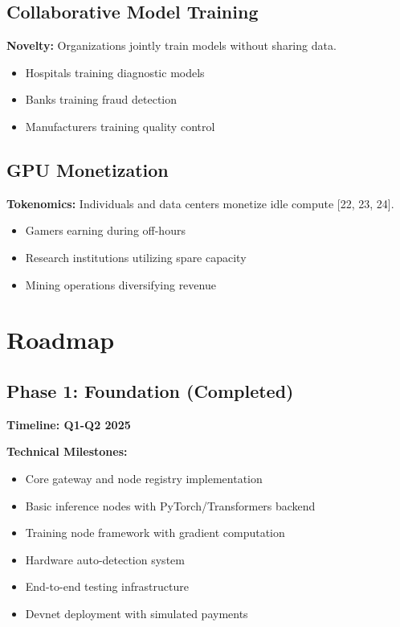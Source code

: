 \documentclass[11pt,a4paper]{article}
\begin{document}
\subsection{Collaborative Model Training}

\textbf{Novelty:} Organizations jointly train models without sharing data.

\begin{itemize}
    \item Hospitals training diagnostic models
    \item Banks training fraud detection
    \item Manufacturers training quality control
\end{itemize}

\subsection{GPU Monetization}

\textbf{Tokenomics:} Individuals and data centers monetize idle compute [22, 23, 24].

\begin{itemize}
    \item Gamers earning during off-hours
    \item Research institutions utilizing spare capacity
    \item Mining operations diversifying revenue
\end{itemize}

\section{Roadmap}

\subsection{Phase 1: Foundation (Completed)}

\textbf{Timeline: Q1-Q2 2025}

\textbf{Technical Milestones:}
\begin{itemize}
    \item[$\checkmark$] Core gateway and node registry implementation
    \item[$\checkmark$] Basic inference nodes with PyTorch/Transformers backend
    \item[$\checkmark$] Training node framework with gradient computation
    \item[$\checkmark$] Hardware auto-detection system
    \item[$\checkmark$] End-to-end testing infrastructure
    \item[$\checkmark$] Devnet deployment with simulated payments
\end{itemize}
\end{document}
